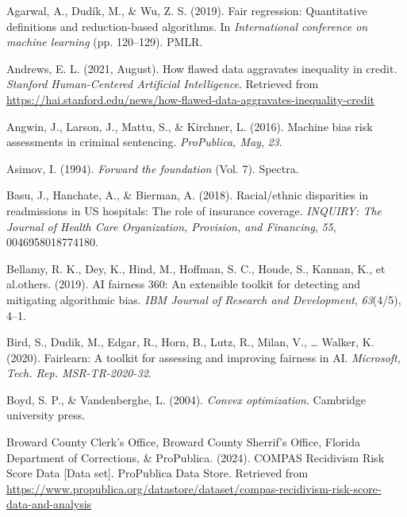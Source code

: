 \documentclass[12pt, twoside]{amherstthesis}
\newenvironment{CSLReferences}[2]%
  {}%
  {\par}
\begin{document}
\hypertarget{refs}{}
\begin{CSLReferences}{1}{0}
\leavevmode{}%
Agarwal, A., Dudík, M., \& Wu, Z. S. (2019). Fair regression: Quantitative definitions and reduction-based algorithms. In \emph{International conference on machine learning} (pp. 120--129). PMLR.

\leavevmode{}%
Andrews, E. L. (2021, August). How flawed data aggravates inequality in credit. \emph{Stanford Human-Centered Artificial Intelligence}. Retrieved from \url{https://hai.stanford.edu/news/how-flawed-data-aggravates-inequality-credit}

\leavevmode{}%
Angwin, J., Larson, J., Mattu, S., \& Kirchner, L. (2016). Machine bias risk assessments in criminal sentencing. \emph{ProPublica, May}, \emph{23}.

\leavevmode{}%
Asimov, I. (1994). \emph{Forward the foundation} (Vol. 7). Spectra.

\leavevmode{}%
Basu, J., Hanchate, A., \& Bierman, A. (2018). Racial/ethnic disparities in readmissions in US hospitals: The role of insurance coverage. \emph{INQUIRY: The Journal of Health Care Organization, Provision, and Financing}, \emph{55}, 0046958018774180.

\leavevmode{}%
Bellamy, R. K., Dey, K., Hind, M., Hoffman, S. C., Houde, S., Kannan, K., et al.others. (2019). AI fairness 360: An extensible toolkit for detecting and mitigating algorithmic bias. \emph{IBM Journal of Research and Development}, \emph{63}(4/5), 4--1.

\leavevmode{}%
Bird, S., Dudik, M., Edgar, R., Horn, B., Lutz, R., Milan, V., \ldots{} Walker, K. (2020). Fairlearn: A toolkit for assessing and improving fairness in AI. \emph{Microsoft, Tech. Rep. MSR-TR-2020-32}.

\leavevmode{}%
Boyd, S. P., \& Vandenberghe, L. (2004). \emph{Convex optimization}. Cambridge university press.

\leavevmode{}%
Broward County Clerk's Office, Broward County Sherrif's Office, Florida Department of Corrections, \& ProPublica. (2024). {COMPAS Recidivism Risk Score Data} {[}Data set{]}. ProPublica Data Store. Retrieved from \url{https://www.propublica.org/datastore/dataset/compas-recidivism-risk-score-data-and-analysis}


\end{CSLReferences}
\end{document}
